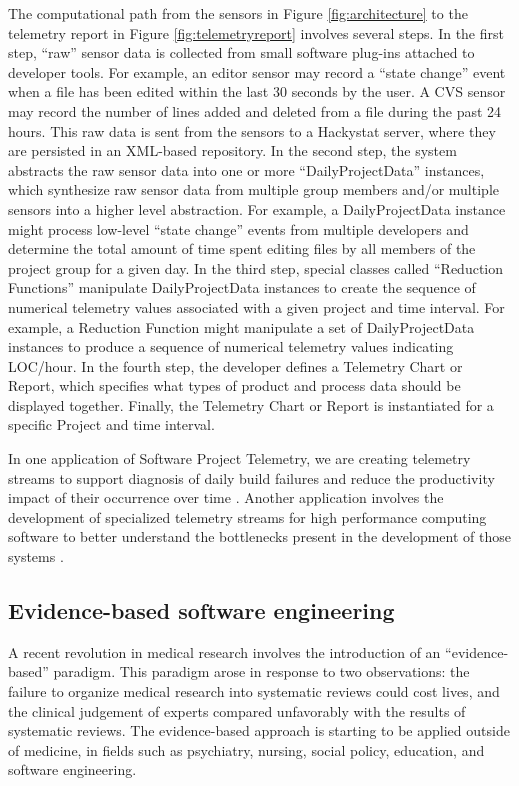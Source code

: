 The computational path from the sensors in Figure \ref{fig:architecture} to
the telemetry report in Figure \ref{fig:telemetryreport} involves several
steps.  In the first step, ``raw'' sensor data is collected from small
software plug-ins attached to developer tools. For example, an editor
sensor may record a ``state change'' event when a file has been edited
within the last 30 seconds by the user.  A CVS sensor may record the number
of lines added and deleted from a file during the past 24 hours.  This raw
data is sent from the sensors to a Hackystat server, where they are
persisted in an XML-based repository.  In the second step, the system
abstracts the raw sensor data into one or more ``DailyProjectData''
instances, which synthesize raw sensor data from multiple group members
and/or multiple sensors into a higher level abstraction.  For example, a
DailyProjectData instance might process low-level ``state change'' events
from multiple developers and determine the total amount of time spent
editing files by all members of the project group for a given day.  In the
third step, special classes called ``Reduction Functions'' manipulate
DailyProjectData instances to create the sequence of numerical telemetry
values associated with a given project and time interval. For example, a
Reduction Function might manipulate a set of DailyProjectData instances to
produce a sequence of numerical telemetry values indicating LOC/hour.  In
the fourth step, the developer defines a Telemetry Chart or Report, which
specifies what types of product and process data should be displayed
together.  Finally, the Telemetry Chart or Report is instantiated for a
specific Project and time interval.

In one application of Software Project Telemetry, we are
creating telemetry streams to support diagnosis of daily build failures and
reduce the productivity impact of their occurrence over time
\cite{csdl2-04-11}.  Another application involves the development of
specialized telemetry streams for high performance computing software to
better understand the bottlenecks present in the development of those
systems \cite{csdl2-04-22}.

\subsection{Evidence-based software engineering}

A recent revolution in medical research involves the introduction of an
``evidence-based'' paradigm.  This paradigm arose in response to two
observations: the failure to organize medical research into systematic
reviews could cost lives, and the clinical judgement of experts compared
unfavorably with the results of systematic reviews.   The evidence-based 
approach is starting to be applied outside of medicine, in fields such as
psychiatry, nursing, social policy, education, and software engineering. 

